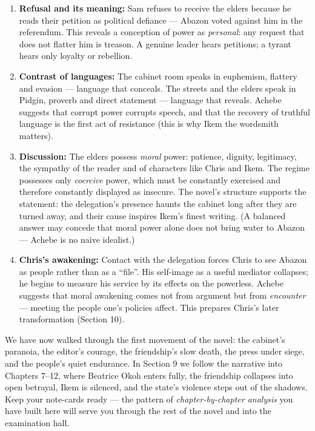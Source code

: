 \documentclass[11pt]{article}
\newcounter{popsec}
\newcounter{popsub}
\newcommand{\courssub}[1]{%
  \stepcounter{popsub}%
  \par\vspace{9pt}\noindent{\popxbold\fontsize{11.5}{13}\selectfont\color{popink}{\color{poporange}\thepopsec.\thepopsub}\hspace{6pt}#1}\par\nopagebreak\vspace{4pt}
}
\begin{document}
\begin{corrige}
\begin{enumerate}
\item \textbf{Refusal and its meaning:} Sam refuses to receive the elders because he reads their petition as political defiance — Abazon voted against him in the referendum. This reveals a conception of power as \emph{personal}: any request that does not flatter him is treason. A genuine leader hears petitions; a tyrant hears only loyalty or rebellion.
\item \textbf{Contrast of languages:} The cabinet room speaks in euphemism, flattery and evasion — language that conceals. The streets and the elders speak in Pidgin, proverb and direct statement — language that reveals. Achebe suggests that corrupt power corrupts speech, and that the recovery of truthful language is the first act of resistance (this is why Ikem the wordsmith matters).
\item \textbf{Discussion:} The elders possess \emph{moral} power: patience, dignity, legitimacy, the sympathy of the reader and of characters like Chris and Ikem. The regime possesses only \emph{coercive} power, which must be constantly exercised and therefore constantly displayed as insecure. The novel’s structure supports the statement: the delegation’s presence haunts the cabinet long after they are turned away, and their cause inspires Ikem’s finest writing. (A balanced answer may concede that moral power alone does not bring water to Abazon — Achebe is no naive idealist.)
\item \textbf{Chris’s awakening:} Contact with the delegation forces Chris to see Abazon as people rather than as a “file”. His self-image as a useful mediator collapses; he begins to measure his service by its effects on the powerless. Achebe suggests that moral awakening comes not from argument but from \emph{encounter} — meeting the people one’s policies affect. This prepares Chris’s later transformation (Section 10).
\end{enumerate}
\end{corrige}

\courssub{Transition to Section 9}

We have now walked through the first movement of the novel: the cabinet’s paranoia, the editor’s courage, the friendship’s slow death, the press under siege, and the people’s quiet endurance. In Section 9 we follow the narrative into Chapters 7–12, where Beatrice Okoh enters fully, the friendship collapses into open betrayal, Ikem is silenced, and the state’s violence steps out of the shadows. Keep your note-cards ready — the pattern of \emph{chapter-by-chapter analysis} you have built here will serve you through the rest of the novel and into the examination hall.
\end{document}
